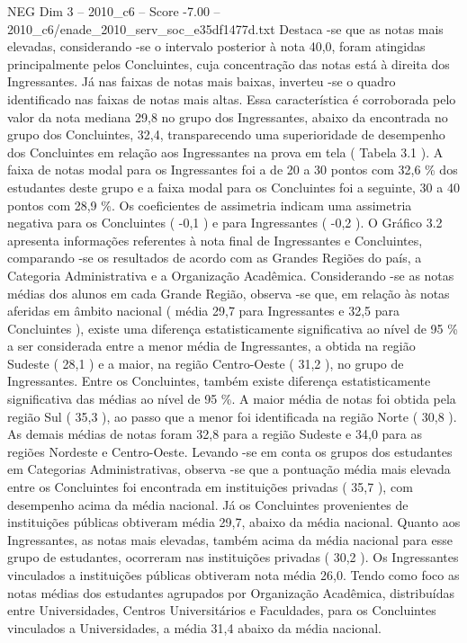 \begin{textsample}{NEG Dim 3 – 2010\_c6 – Score -7.00 – 2010\_c6/enade\_2010\_serv\_soc\_e35df1477d.txt}
Destaca -se que as notas mais elevadas, considerando -se o intervalo posterior à nota 40,0, foram atingidas principalmente pelos Concluintes, cuja concentração das notas está à direita dos Ingressantes.
Já nas faixas de notas mais baixas, inverteu -se o quadro identificado nas faixas de notas mais altas.
Essa característica é corroborada pelo valor da nota mediana 29,8 no grupo dos Ingressantes, abaixo da encontrada no grupo dos Concluintes, 32,4, transparecendo uma superioridade de desempenho dos Concluintes em relação aos Ingressantes na prova em tela ( Tabela 3.1 ).
A faixa de notas modal para os Ingressantes foi a de 20 a 30 pontos com 32,6 \% dos estudantes deste grupo e a faixa modal para os Concluintes foi a seguinte, 30 a 40 pontos com 28,9 \%.
Os coeficientes de assimetria indicam uma assimetria negativa para os Concluintes ( -0,1 ) e para Ingressantes ( -0,2 ).
O Gráfico 3.2 apresenta informações referentes à nota final de Ingressantes e Concluintes, comparando -se os resultados de acordo com as Grandes Regiões do país, a Categoria Administrativa e a Organização Acadêmica.
Considerando -se as notas médias dos alunos em cada Grande Região, observa -se que, em relação às notas aferidas em âmbito nacional ( média 29,7 para Ingressantes e 32,5 para Concluintes ), existe uma diferença estatisticamente significativa ao nível de 95 \% a ser considerada entre a menor média de Ingressantes, a obtida na região Sudeste ( 28,1 ) e a maior, na região Centro-Oeste ( 31,2 ), no grupo de Ingressantes.
Entre os Concluintes, também existe diferença estatisticamente significativa das médias ao nível de 95 \%.
A maior média de notas foi obtida pela região Sul ( 35,3 ), ao passo que a menor foi identificada na região Norte ( 30,8 ).
As demais médias de notas foram 32,8 para a região Sudeste e 34,0 para as regiões Nordeste e Centro-Oeste.
Levando -se em conta os grupos dos estudantes em Categorias Administrativas, observa -se que a pontuação média mais elevada entre os Concluintes foi encontrada em instituições privadas ( 35,7 ), com desempenho acima da média nacional.
Já os Concluintes provenientes de instituições públicas obtiveram média 29,7, abaixo da média nacional.
Quanto aos Ingressantes, as notas mais elevadas, também acima da média nacional para esse grupo de estudantes, ocorreram nas instituições privadas ( 30,2 ).
Os Ingressantes vinculados a instituições públicas obtiveram nota média 26,0.
Tendo como foco as notas médias dos estudantes agrupados por Organização Acadêmica, distribuídas entre Universidades, Centros Universitários e Faculdades, para os Concluintes vinculados a Universidades, a média 31,4 abaixo da média nacional.

\end{textsample}
